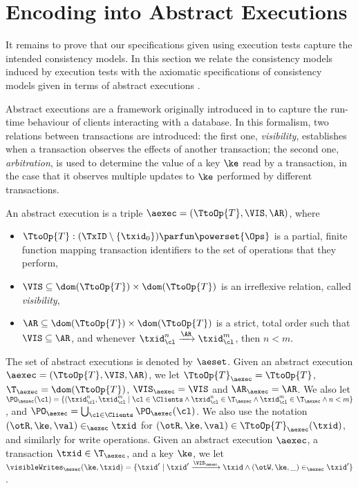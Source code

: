 \section{Encoding into Abstract Executions}
It remains to prove that our specifications given using execution tests 
capture the intended consistency models. 
In this section we relate the consistency models induced by execution tests with 
the axiomatic specifications of consistency models given in terms of abstract executions 
\cite{framework-concur,laws}. 

Abstract executions are a framework originally introduced in \cite{ev-transactions} 
to capture the run-time behaviour of clients interacting with a database. In this 
formalism, two relations between transactions are introduced: the first one, \emph{visibility}, 
establishes when a transaction observes the effects of another transaction; the 
second one,  \emph{arbitration}, is used to determine the value of a key $\ke$ read by 
a transaction, in the case that it observes multiple updates to $\ke$ performed by different 
transactions. 
\begin{definition}
\label{def:absexec}
\label{def:aexec}
An abstract execution is a triple $\aexec = (\TtoOp{T}, \VIS, \AR)$, where 
\begin{itemize}
\item $\TtoOp{T}: (\TxID \setminus \{\txid_0\}) \parfun \powerset{\Ops}$ is a partial, 
finite function mapping transaction identifiers to the set of operations that they perform,
\item $\VIS \subseteq \dom(\TtoOp{T}) \times \dom(\TtoOp{T})$ is an irreflexive relation, 
called \emph{visibility}, 
\item $\AR \subseteq \dom(\TtoOp{T}) \times \dom(\TtoOp{T})$ is a strict, total order 
such that $\VIS \subseteq \AR$, and whenever $\txid_{\cl}^{n} \xrightarrow{\AR} 
\txid_{\cl}^{m}$, then $n < m$.
\end{itemize} 
\end{definition}
The set of abstract executions is denoted by $\aeset$.
Given an abstract execution $\aexec = (\TtoOp{T}, \VIS, \AR)$, we let 
$\TtoOp{T}_{\aexec} = \TtoOp{T}$, $\T_{\aexec} = \dom(\TtoOp{T})$, $\VIS_{\aexec} = \VIS$ 
and $\AR_{\aexec} = \AR$. We also let $\PO_{\aexec}(\cl) = \{(\txid_{\cl}^{n}, \txid_{\cl}^{m} \mid \cl \in \Clients 
\wedge  \txid_{\cl}^{n} \in \T_{\aexec} \wedge \txid_{\cl}^{m} \in \T_{\aexec} \wedge n < m\}$, and 
$\PO_{\aexec} = \bigcup_{\cl \in \Clients} \PO_{\aexec}(\cl)$.
We also use the notation $(\otR, \ke, \val) \in_{\aexec} \txid$ for $(\otR, \ke, \val) \in \TtoOp{T}_{\aexec}(\txid)$, 
and similarly for write operations. 
Given an abstract execution $\aexec$, a transaction $\txid \in \T_{\aexec}$, and a key $\ke$, 
we let $\visibleWrites_{\aexec}(\ke, \txid) = \{ \txid' \mid \txid' \xrightarrow{\VIS_{\aexec}} \txid \wedge 
(\otW, \ke, \_) \in_{\aexec} \txid'\}$.

